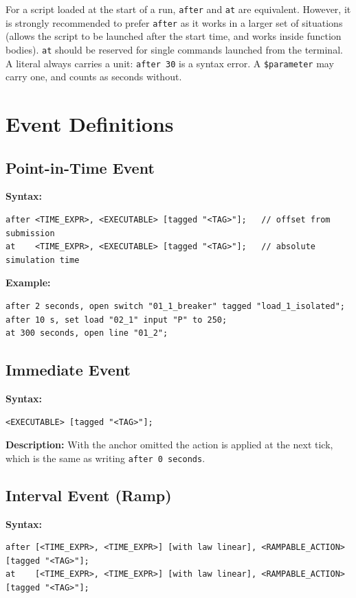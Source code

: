 \documentclass[12pt]{article}
\begin{document}
For a script loaded at the start of a run, \texttt{after} and \texttt{at} are equivalent. However, it is strongly recommended to prefer \texttt{after} as it works in a larger set of situations (allows the script to be launched after the start time, and works inside function bodies). \texttt{at} should be reserved for single commands launched from the terminal. A literal always carries a unit: \texttt{after 30} is a syntax error. A \texttt{\$parameter} may carry one, and counts as seconds without.

\section{Event Definitions}

\subsection{Point-in-Time Event}

\textbf{Syntax:}
\begin{lstlisting}
after <TIME_EXPR>, <EXECUTABLE> [tagged "<TAG>"];   // offset from submission
at    <TIME_EXPR>, <EXECUTABLE> [tagged "<TAG>"];   // absolute simulation time
\end{lstlisting}

\textbf{Example:}
\begin{lstlisting}
after 2 seconds, open switch "01_1_breaker" tagged "load_1_isolated";
after 10 s, set load "02_1" input "P" to 250;
at 300 seconds, open line "01_2";
\end{lstlisting}

\subsection{Immediate Event}

\textbf{Syntax:}
\begin{lstlisting}
<EXECUTABLE> [tagged "<TAG>"];
\end{lstlisting}

\textbf{Description:} With the anchor omitted the action is applied at the next tick, which is the same as writing \texttt{after 0 seconds}.

\subsection{Interval Event (Ramp)}

\textbf{Syntax:}
\begin{lstlisting}
after [<TIME_EXPR>, <TIME_EXPR>] [with law linear], <RAMPABLE_ACTION> [tagged "<TAG>"];
at    [<TIME_EXPR>, <TIME_EXPR>] [with law linear], <RAMPABLE_ACTION> [tagged "<TAG>"];
\end{lstlisting}
\end{document}
